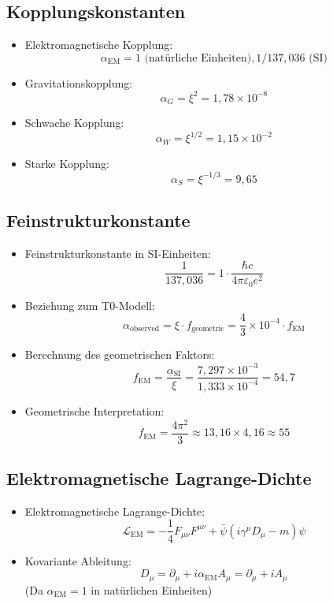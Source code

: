 \documentclass[12pt,a4paper]{article}
\begin{document}
	\subsection{Kopplungskonstanten}
	\begin{itemize}
		\item Elektromagnetische Kopplung:
		$$\alpha_{\text{EM}} = 1 \text{ (nat\"{u}rliche Einheiten)}, 1/137,036 \text{ (SI)}$$
		
		\item Gravitationskopplung:
		$$\alpha_G = \xi^2 = 1,78 \times 10^{-8}$$
		
		\item Schwache Kopplung:
		$$\alpha_W = \xi^{1/2} = 1,15 \times 10^{-2}$$
		
		\item Starke Kopplung:
		$$\alpha_S = \xi^{-1/3} = 9,65$$
	\end{itemize}
	
	\subsection{Feinstrukturkonstante}
	\begin{itemize}
		\item Feinstrukturkonstante in SI-Einheiten:
		$$\frac{1}{137,036} = 1 \cdot \frac{\hbar c}{4\pi\varepsilon_0 e^2}$$
		
		\item Beziehung zum T0-Modell:
		$$\alpha_{\text{observed}} = \xi \cdot f_{\text{geometric}} = \frac{4}{3} \times 10^{-4} \cdot f_{\text{EM}}$$
		
		\item Berechnung des geometrischen Faktors:
		$$f_{\text{EM}} = \frac{\alpha_{\text{SI}}}{\xi} = \frac{7,297 \times 10^{-3}}{1,333 \times 10^{-4}} = 54,7$$
		
		\item Geometrische Interpretation:
		$$f_{\text{EM}} = \frac{4\pi^2}{3} \approx 13,16 \times 4,16 \approx 55$$
	\end{itemize}
	
	\subsection{Elektromagnetische Lagrange-Dichte}
	\begin{itemize}
		\item Elektromagnetische Lagrange-Dichte:
		$$\mathcal{L}_{\text{EM}} = -\frac{1}{4}F_{\mu\nu}F^{\mu\nu} + \bar{\psi}(i\gamma^\mu D_\mu - m)\psi$$
		
		\item Kovariante Ableitung:
		$$D_\mu = \partial_\mu + i \alpha_{\text{EM}} A_\mu = \partial_\mu + i A_\mu$$
		(Da $\alpha_{\text{EM}} = 1$ in nat\"{u}rlichen Einheiten)
	\end{itemize}
	
\end{document}
